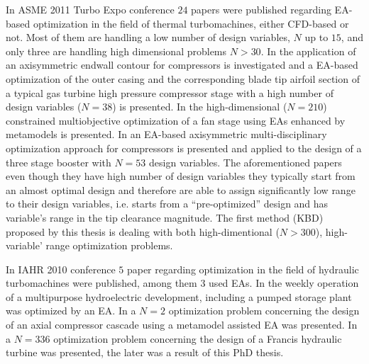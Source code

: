 In ASME 2011 Turbo Expo conference $24$ papers were published regarding EA-based optimization in the field of thermal turbomachines, either CFD-based or not. Most of them are handling a low number of design variables, $N$ up to $15$, and only three \cite{Georg2011,Marcel2011,Kevin2011} are handling high dimensional problems $N\!>\!30$. In \cite{Georg2011} the application of an axisymmetric endwall contour for compressors is investigated and a EA-based optimization of the outer casing and the corresponding blade tip airfoil section of a typical gas turbine high pressure compressor stage with a high number of design variables ($N\!=\!38$) is presented. In \cite{Marcel2011} the high-dimensional ($N\!=\!210$) constrained multiobjective optimization of a fan stage  using EAs enhanced by metamodels is presented. In \cite{Kevin2011} an EA-based axisymmetric multi-disciplinary optimization approach for compressors is presented and applied to the design of a three stage booster with $N\!=\!53$ design variables. The aforementioned papers even though they have high number of design variables they typically start from an almost optimal design and therefore are able to assign significantly low range to their design variables, i.e. \cite{Marcel2011} starts from a ``pre-optimized'' design and \cite{Georg2011} has variable's range in the tip clearance magnitude. The first method (KBD) proposed by this thesis is dealing with both high-dimentional ($N\!>\!300$), high-variable' range optimization problems.      

In IAHR 2010 conference $5$ paper regarding optimization in the field of hydraulic turbomachines were published, among them $3$ \cite{Raimunda2010,Kyriacou2010,Popa2010} used EAs. In \cite{Popa2010} the weekly operation of a multipurpose
hydroelectric development, including a pumped storage plant was optimized by an EA. In \cite{Raimunda2010} a $N\!=\!2$ optimization problem concerning the design of an axial compressor cascade using a metamodel assisted EA was presented.  In \cite{Kyriacou2010} a $N\!=\!336$ optimization problem concerning the design of a Francis hydraulic turbine was presented, the later was a result of this PhD thesis. 


